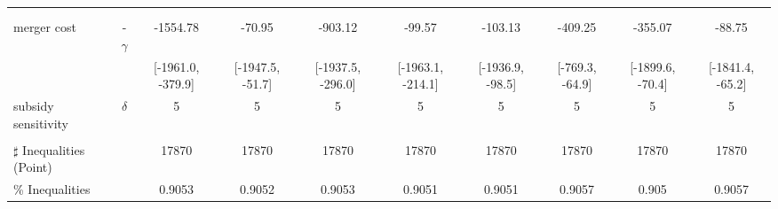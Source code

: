 \begin{tabular}{@{\extracolsep{5pt}}lccccccccc}
 &  &  &  &  &  &  &  &  &  \\
 &  &  &  &  &  &  &  &  &  \\
merger cost & -$\gamma$ & -1554.78 & -70.95 & -903.12 & -99.57 & -103.13 & -409.25 & -355.07 & -88.75 \\
 &  & [-1961.0, -379.9] & [-1947.5, -51.7] & [-1937.5, -296.0] & [-1963.1, -214.1] & [-1936.9, -98.5] & [-769.3, -64.9] & [-1899.6, -70.4] & [-1841.4, -65.2] \\
subsidy sensitivity & $\delta$ & 5 & 5 & 5 & 5 & 5 & 5 & 5 & 5 \\
 &  &  &  &  &  &  &  &  &  \\
\hline 
$\sharp$ Inequalities (Point) &  & 17870 & 17870 & 17870 & 17870 & 17870 & 17870 & 17870 & 17870 \\
\% Inequalities &  & 0.9053 & 0.9052 & 0.9053 & 0.9051 & 0.9051 & 0.9057 & 0.905 & 0.9057 \\
\bottomrule 
\end{tabular}
